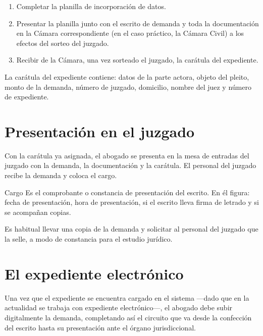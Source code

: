 \documentclass[12pt,oneside]{book}
\begin{document}
\begin{enumerate}
    \item Completar la planilla de incorporación de datos.
    \item Presentar la planilla junto con el escrito de demanda y toda la documentación en la Cámara correspondiente (en el caso práctico, la Cámara Civil) a los efectos del sorteo del juzgado.
    \item Recibir de la Cámara, una vez sorteado el juzgado, la carátula del expediente.
\end{enumerate}

\begin{note}
La carátula del expediente contiene: datos de la parte actora, objeto del pleito, monto de la demanda, número de juzgado, domicilio, nombre del juez y número de expediente.
\end{note}

\section{Presentación en el juzgado}

Con la carátula ya asignada, el abogado se presenta en la mesa de entradas del juzgado con la demanda, la documentación y la carátula. El personal del juzgado recibe la demanda y coloca el cargo.

\begin{definition}{Cargo}
Es el comprobante o constancia de presentación del escrito. En él figura: fecha de presentación, hora de presentación, si el escrito lleva firma de letrado y si se acompañan copias.
\end{definition}

\begin{note}
Es habitual llevar una copia de la demanda y solicitar al personal del juzgado que la selle, a modo de constancia para el estudio jurídico.
\end{note}

\section{El expediente electrónico}

Una vez que el expediente se encuentra cargado en el sistema —dado que en la actualidad se trabaja con expediente electrónico—, el abogado debe subir digitalmente la demanda, completando así el circuito que va desde la confección del escrito hasta su presentación ante el órgano jurisdiccional.
\end{document}
